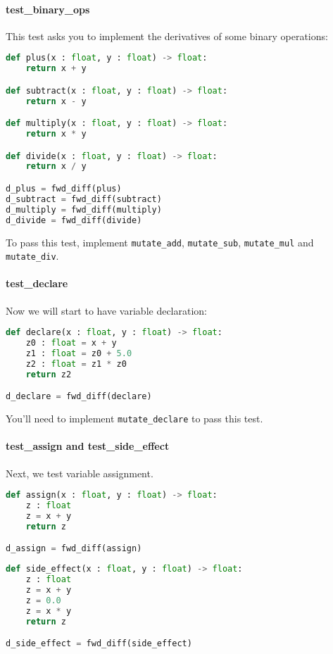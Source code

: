 \paragraph{test_binary_ops} This test asks you to implement the derivatives of some binary operations:
\begin{lstlisting}[language=Python]
def plus(x : float, y : float) -> float:
    return x + y

def subtract(x : float, y : float) -> float:
    return x - y

def multiply(x : float, y : float) -> float:
    return x * y

def divide(x : float, y : float) -> float:
    return x / y

d_plus = fwd_diff(plus)
d_subtract = fwd_diff(subtract)
d_multiply = fwd_diff(multiply)
d_divide = fwd_diff(divide)
\end{lstlisting}
To pass this test, implement \lstinline{mutate_add}, \lstinline{mutate_sub}, \lstinline{mutate_mul} and \lstinline{mutate_div}.

\paragraph{test_declare} Now we will start to have variable declaration:
\begin{lstlisting}[language=Python]
def declare(x : float, y : float) -> float:
    z0 : float = x + y
    z1 : float = z0 + 5.0
    z2 : float = z1 * z0
    return z2

d_declare = fwd_diff(declare)
\end{lstlisting}
You'll need to implement \lstinline{mutate_declare} to pass this test.

\paragraph{test_assign and test_side_effect} Next, we test variable assignment.
\begin{lstlisting}[language=Python]
def assign(x : float, y : float) -> float:
    z : float
    z = x + y
    return z

d_assign = fwd_diff(assign)
\end{lstlisting}

\begin{lstlisting}[language=Python]
def side_effect(x : float, y : float) -> float:
    z : float
    z = x + y
    z = 0.0
    z = x * y
    return z

d_side_effect = fwd_diff(side_effect)
\end{lstlisting}

